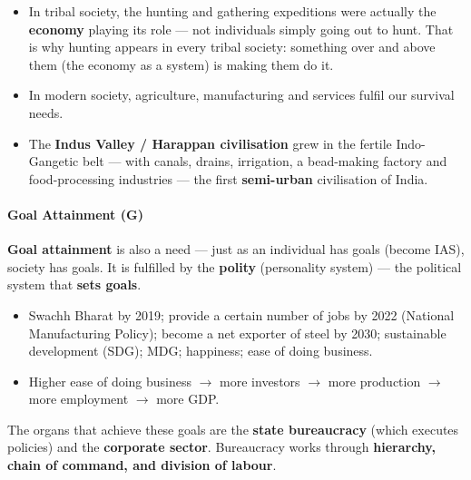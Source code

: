 \begin{ExampleBox}
\begin{itemize}
\item In tribal society, the hunting and gathering expeditions were actually the \textbf{economy} playing its role --- not individuals simply going out to hunt. That is why hunting appears in every tribal society: something over and above them (the economy as a system) is making them do it.
\item In modern society, agriculture, manufacturing and services fulfil our survival needs.
\item The \textbf{Indus Valley / Harappan civilisation} grew in the fertile Indo-Gangetic belt --- with canals, drains, irrigation, a bead-making factory and food-processing industries --- the first \textbf{semi-urban} civilisation of India.
\end{itemize}
\end{ExampleBox}

\paragraph{Goal Attainment (G)}
\textbf{Goal attainment} is also a need --- just as an individual has goals (become IAS), society has goals. It is fulfilled by the \textbf{polity} (personality system) --- the political system that \textbf{sets goals}.

\begin{DataFact}
\begin{itemize}
\item Swachh Bharat by 2019; provide a certain number of jobs by 2022 (National Manufacturing Policy); become a net exporter of steel by 2030; sustainable development (SDG); MDG; happiness; ease of doing business.
\end{itemize}
\end{DataFact}

\begin{ExampleBox}
\begin{itemize}
\item Higher ease of doing business $\rightarrow$ more investors $\rightarrow$ more production $\rightarrow$ more employment $\rightarrow$ more GDP.
\end{itemize}
\end{ExampleBox}

The organs that achieve these goals are the \textbf{state bureaucracy} (which executes policies) and the \textbf{corporate sector}. Bureaucracy works through \textbf{hierarchy, chain of command, and division of labour}.

